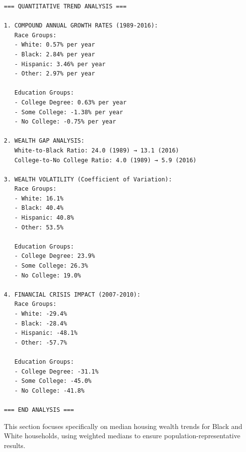 \documentclass[
  letterpaper,
  DIV=11,
  numbers=noendperiod]{scrartcl}
\begin{document}
\begin{verbatim}
=== QUANTITATIVE TREND ANALYSIS ===

1. COMPOUND ANNUAL GROWTH RATES (1989-2016):
   Race Groups:
   - White: 0.57% per year
   - Black: 2.84% per year
   - Hispanic: 3.46% per year
   - Other: 2.97% per year

   Education Groups:
   - College Degree: 0.63% per year
   - Some College: -1.38% per year
   - No College: -0.75% per year

2. WEALTH GAP ANALYSIS:
   White-to-Black Ratio: 24.0 (1989) → 13.1 (2016)
   College-to-No College Ratio: 4.0 (1989) → 5.9 (2016)

3. WEALTH VOLATILITY (Coefficient of Variation):
   Race Groups:
   - White: 16.1%
   - Black: 40.4%
   - Hispanic: 40.8%
   - Other: 53.5%

   Education Groups:
   - College Degree: 23.9%
   - Some College: 26.3%
   - No College: 19.0%

4. FINANCIAL CRISIS IMPACT (2007-2010):
   Race Groups:
   - White: -29.4%
   - Black: -28.4%
   - Hispanic: -48.1%
   - Other: -57.7%

   Education Groups:
   - College Degree: -31.1%
   - Some College: -45.0%
   - No College: -41.8%

=== END ANALYSIS ===
\end{verbatim}

This section focuses specifically on median housing wealth trends for
Black and White households, using weighted medians to ensure
population-representative results.
\end{document}
